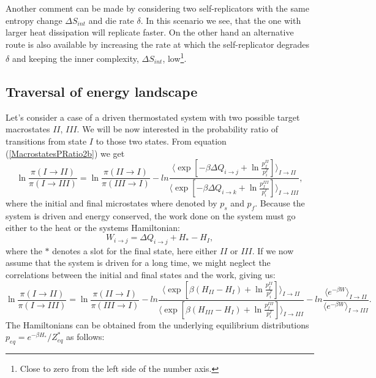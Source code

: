 \documentclass[a4paper,12pt]{article}
\begin{document}
Another comment can be made by considering two self-replicators with the same entropy change $\Delta S_{int}$ and die rate $\delta$. In this scenario we see, that the one with larger heat dissipation will replicate faster.
On the other hand an alternative route is also available by increasing the rate at which the self-replicator degrades $\delta $ and keeping the inner complexity, $\Delta S_{int}$, low\footnote{Close to zero from the left side of the number axis.}.

\subsection{Traversal of energy landscape }

Let's consider a case of a driven thermostated system with two possible target macrostates $II$, $III$. We will be now interested in the probability ratio of transitions from state $I$ to those two states. From equation (\ref{MacrostatesPRatio2b}) we get
\begin{equation}
  \ln \frac{\pi(I \to II)}{\pi(I \to III)} = \ln \frac{\pi(II \to I)}{\pi(III \to I)}- ln \frac{ \langle \exp[-\beta \Delta Q_{i \to j} + \ln \frac{p_f^{II}}{p_i^{I}}] \rangle_{I \to II}}{ \langle \exp[-\beta \Delta Q_{i \to k} + \ln \frac{p_f^{III}}{p_i^{I}}] \rangle_{I \to III}},
\end{equation}
where the initial and final microstates where denoted by $p_s$ and $p_f$.
Because the system is driven and energy conserved, the work done on the system must go either to the heat or the systems Hamiltonian:
\begin{equation}
  W_{i \to j}=  \Delta Q_{i \to j} + H_*- H_I,
\end{equation}
where the $*$ denotes a slot for the final state, here either $II$ or $III$.
If we now assume that the system is driven for a long time, we might neglect the correlations between the initial and final states and the work, giving us:
\begin{equation}
  \ln \frac{\pi(I \to II)}{\pi(I \to III)} = \ln \frac{\pi(II \to I)}{\pi(III \to I)}- ln \frac{ \langle \exp[\beta (H_{II}-H_I) + \ln \frac{p_f^{II}}{p_i^{I}}] \rangle_{I \to II}}{ \langle \exp[\beta (H_{III}-H_I) + \ln \frac{p_f^{III}}{p_i^{I}}] \rangle_{I \to III}}-ln \frac{\langle e^{ - \beta W} \rangle_{I \to II}}{\langle e^{ - \beta W} \rangle_{I \to III}}.
\end{equation}
The Hamiltonians can be obtained from the underlying equilibrium distributions $p_{eq}= e^{-\beta H_*}/Z_{eq}^*$ as follows:
\end{document}
